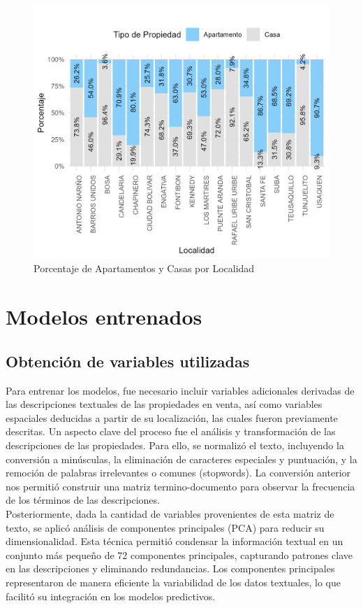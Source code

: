 \documentclass[a4paper]{article}
\theoremstyle{remark}
\theoremstyle{definition}
\begin{document}
\begin{figure}[H]
    \centering
    \caption{Porcentaje de Apartamentos y Casas por Localidad}
    \includegraphics[width=0.4\linewidth]{Graficas/Tipo_propiedad_local.png}
\end{figure}

\section{Modelos entrenados}

\subsection{Obtención de variables utilizadas}

Para entrenar los modelos, fue necesario incluir variables adicionales derivadas de las descripciones textuales de las propiedades en venta, así como variables espaciales deducidas a partir de su localización, las cuales fueron previamente descritas. Un aspecto clave del proceso fue el análisis y transformación de las descripciones de las propiedades. Para ello, se normalizó el texto, incluyendo  la conversión a minúsculas, la eliminación de caracteres especiales y puntuación, y la remoción de palabras irrelevantes o comunes (stopwords). La conversión anterior nos permitió construir una matriz termino-documento para observar la frecuencia de los términos de las descripciones.\\

Posteriormente, dada la cantidad de variables provenientes de esta matriz de texto, se aplicó análisis de componentes principales (PCA) para reducir su dimensionalidad. Esta técnica permitió condensar la información textual en un conjunto más pequeño de 72 componentes principales, capturando patrones clave en las descripciones y eliminando redundancias. Los componentes principales representaron de manera eficiente la variabilidad de los datos textuales, lo que facilitó su integración en los modelos predictivos.
\end{document}

